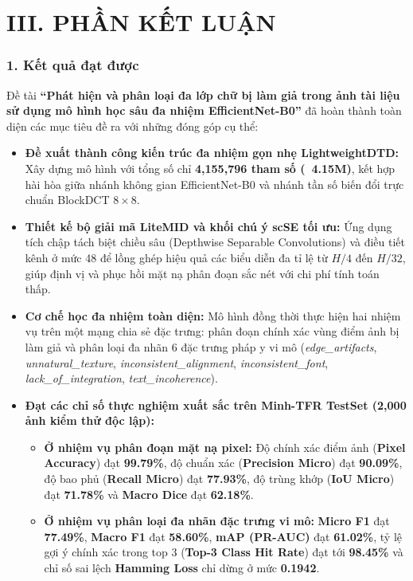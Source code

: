 \chapter{III. PHẦN KẾT LUẬN}

\subsection{1. Kết quả đạt được}

\indent\indent Đề tài \textbf{``Phát hiện và phân loại đa lớp chữ bị làm giả trong ảnh tài liệu sử dụng mô hình học sâu đa nhiệm EfficientNet-B0''} đã hoàn thành toàn diện các mục tiêu đề ra với những đóng góp cụ thể:

\begin{itemize}[label={--}, itemsep=3pt]
    \item \textbf{Đề xuất thành công kiến trúc đa nhiệm gọn nhẹ LightweightDTD:} Xây dựng mô hình với tổng số chỉ \textbf{4,155,796 tham số (~4.15M)}, kết hợp hài hòa giữa nhánh không gian EfficientNet-B0 và nhánh tần số biến đổi trực chuẩn BlockDCT $8 \times 8$.
    \item \textbf{Thiết kế bộ giải mã LiteMID và khối chú ý scSE tối ưu:} Ứng dụng tích chập tách biệt chiều sâu (Depthwise Separable Convolutions) và điều tiết kênh ở mức 48 để lồng ghép hiệu quả các biểu diễn đa tỉ lệ từ $H/4$ đến $H/32$, giúp định vị và phục hồi mặt nạ phân đoạn sắc nét với chi phí tính toán thấp.
    \item \textbf{Cơ chế học đa nhiệm toàn diện:} Mô hình đồng thời thực hiện hai nhiệm vụ trên một mạng chia sẻ đặc trưng: phân đoạn chính xác vùng điểm ảnh bị làm giả và phân loại đa nhãn 6 đặc trưng pháp y vi mô (\textit{edge\_artifacts}, \textit{unnatural\_texture}, \textit{inconsistent\_alignment}, \textit{inconsistent\_font}, \textit{lack\_of\_integration}, \textit{text\_incoherence}).
    \item \textbf{Đạt các chỉ số thực nghiệm xuất sắc trên Minh-TFR TestSet (2,000 ảnh kiểm thử độc lập):}
    \begin{itemize}[label={+}, itemsep=1pt]
        \item \textbf{Ở nhiệm vụ phân đoạn mặt nạ pixel:} Độ chính xác điểm ảnh (\textbf{Pixel Accuracy}) đạt \textbf{99.79\%}, độ chuẩn xác (\textbf{Precision Micro}) đạt \textbf{90.09\%}, độ bao phủ (\textbf{Recall Micro}) đạt \textbf{77.93\%}, độ trùng khớp (\textbf{IoU Micro}) đạt \textbf{71.78\%} và \textbf{Macro Dice} đạt \textbf{62.18\%}.
        \item \textbf{Ở nhiệm vụ phân loại đa nhãn đặc trưng vi mô:} \textbf{Micro F1} đạt \textbf{77.49\%}, \textbf{Macro F1} đạt \textbf{58.60\%}, \textbf{mAP (PR-AUC)} đạt \textbf{61.02\%}, tỷ lệ gợi ý chính xác trong top 3 (\textbf{Top-3 Class Hit Rate}) đạt tới \textbf{98.45\%} và chỉ số sai lệch \textbf{Hamming Loss} chỉ dừng ở mức \textbf{0.1942}.
    \end{itemize}
\end{itemize}

